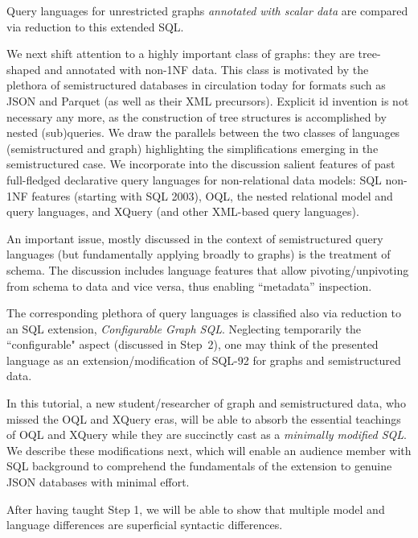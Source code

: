 Query languages for unrestricted graphs {\em annotated with scalar data} are compared via reduction to this extended SQL.

We next shift attention to a highly important class of graphs: they are tree-shaped and annotated with non-1NF data.
This class is motivated by the plethora of semistructured databases in circulation today for formats such as JSON and Parquet (as well as their XML precursors). Explicit id invention is not necessary any more, as the construction of tree structures is accomplished by nested (sub)queries. We draw the parallels between the two classes of languages (semistructured and graph) highlighting the simplifications emerging in the semistructured case. We incorporate into the discussion salient features of past full-fledged declarative query languages for non-relational data models: SQL non-1NF features (starting with SQL 2003), OQL,
the nested relational model and query languages,
and XQuery (and other XML-based query languages).

An important issue, mostly discussed in the context of semistructured query languages (but fundamentally applying broadly to graphs) is the treatment of schema. The discussion includes language features that allow pivoting/unpivoting from schema to data and vice versa, thus enabling ``metadata'' inspection.

The corresponding plethora of query languages is classified also via reduction to an SQL extension, \emph{Configurable Graph SQL}.
Neglecting temporarily the ``configurable" aspect (discussed in Step~2), one may think of the presented language as an extension/modification of SQL-92 for graphs and semistructured data.

In this tutorial, a new student/researcher of graph and semistructured data, who missed the OQL and XQuery eras, will be able to absorb the essential teachings of OQL and XQuery while they are succinctly cast as a {\em minimally modified SQL}. We describe these modifications next, which will enable an audience member with SQL background to comprehend the fundamentals of the extension to genuine JSON databases with minimal effort.

After having taught Step 1, we will be able to show that multiple model and language differences are superficial syntactic differences.

